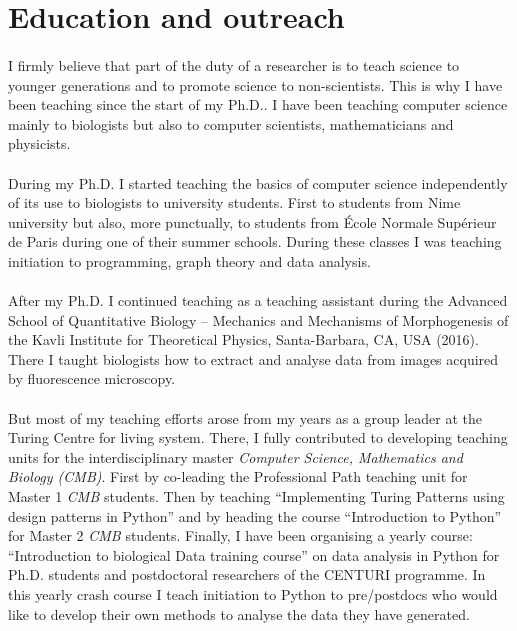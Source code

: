 \section{Education and outreach}
\paragraph{}I firmly believe that part of the duty of a researcher is to teach science to younger generations and to promote science to non-scientists.
This is why I have been teaching since the start of my Ph.D..
I have been teaching computer science mainly to biologists but also to computer scientists, mathematicians and physicists.
\paragraph{}During my Ph.D. I started teaching the basics of computer science independently of its use to biologists to university students.
First to students from Nime university but also, more punctually, to students from \'Ecole Normale Sup\'erieur de Paris during one of their summer schools.
During these classes I was teaching initiation to programming, graph theory and data analysis.
\paragraph{}After my Ph.D. I continued teaching as a teaching assistant during the Advanced School of Quantitative Biology – Mechanics and Mechanisms of Morphogenesis of the Kavli Institute for Theoretical Physics, Santa-Barbara, CA, USA (2016).
There I taught biologists how to extract and analyse data from images acquired by fluorescence microscopy.
\paragraph{}But most of my teaching efforts arose from my years as a group leader at the Turing Centre for living system.
There, I fully contributed to developing teaching units for the interdisciplinary master \emph{Computer Science, Mathematics and Biology (CMB)}.
First by co-leading the Professional Path teaching unit for Master 1 \emph{CMB} students.
Then by teaching ``Implementing Turing Patterns using design patterns in Python'' and by heading the course ``Introduction to Python'' for Master 2 \emph{CMB} students.
Finally, I have been organising a yearly course: ``Introduction to biological Data training course'' on data analysis in Python for Ph.D. students and postdoctoral researchers of the CENTURI programme.
In this yearly crash course I teach initiation to Python to pre/postdocs who would like to develop their own methods to analyse the data they have generated.
